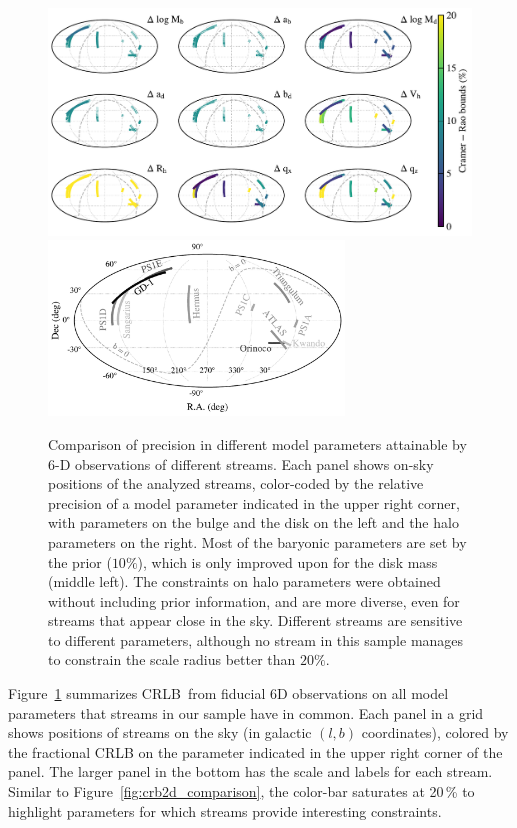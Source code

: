 \documentclass[modern]{aastex61}
\newcommand{\acronym}[1]{{\small{#1}}}
\newcommand{\CRLB}{\acronym{CRLB}}
\begin{document}
\begin{figure}
\begin{center}
\includegraphics[width=\textwidth]{crb_onsky_gal0.pdf}
\includegraphics[width=0.7\textwidth]{sky_legend_gal0.pdf}
\caption{Comparison of precision in different model parameters attainable by 6-D observations of different streams.
Each panel shows on-sky positions of the analyzed streams, color-coded by the relative precision of a model parameter indicated in the upper right corner, with parameters on the bulge and the disk on the left and the halo parameters on the right.
Most of the baryonic parameters are set by the prior ($10\%$), which is only improved upon for the disk mass (middle left).
The constraints on halo parameters were obtained without including prior information, and are more diverse, even for streams that appear close in the sky.
Different streams are sensitive to different parameters, although no stream in this sample manages to constrain the scale radius better than $20\%$.
}
\label{fig:sky_precision}
\end{center}
\end{figure}

Figure~\ref{fig:sky_precision} summarizes \CRLB\ from fiducial 6D observations on all model parameters that streams in our sample have in common.
Each panel in a grid shows positions of streams on the sky (in galactic $(l,b)$ coordinates), colored by the fractional CRLB on the parameter indicated in the upper right corner of the panel.
The larger panel in the bottom has the scale and labels for each stream.
Similar to Figure~\ref{fig:crb2d_comparison}, the color-bar saturates at 20\,\% to highlight parameters for which streams provide interesting constraints.
\end{document}
